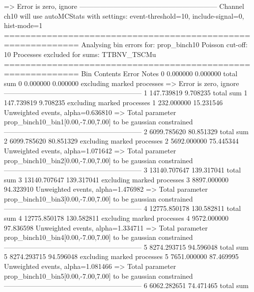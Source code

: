   => Error is zero, ignore      
------------------------------------------------------------
Channel ch10 will use autoMCStats with settings: event-threshold=10, include-signal=0, hist-mode=1
============================================================
Analysing bin errors for: prop_binch10
Poisson cut-off: 10
Processes excluded for sums: TTBNV_TSCMu
============================================================
Bin        Contents        Error           Notes                         
0          0.000000        0.000000        total sum                     
0          0.000000        0.000000        excluding marked processes    
  => Error is zero, ignore      
------------------------------------------------------------
1          147.739819      9.708235        total sum                     
1          147.739819      9.708235        excluding marked processes    
1          232.000000      15.231546       Unweighted events, alpha=0.636810
  => Total parameter prop_binch10_bin1[0.00,-7.00,7.00] to be gaussian constrained
------------------------------------------------------------
2          6099.785620     80.851329       total sum                     
2          6099.785620     80.851329       excluding marked processes    
2          5692.000000     75.445344       Unweighted events, alpha=1.071642
  => Total parameter prop_binch10_bin2[0.00,-7.00,7.00] to be gaussian constrained
------------------------------------------------------------
3          13140.707647    139.317041      total sum                     
3          13140.707647    139.317041      excluding marked processes    
3          8897.000000     94.323910       Unweighted events, alpha=1.476982
  => Total parameter prop_binch10_bin3[0.00,-7.00,7.00] to be gaussian constrained
------------------------------------------------------------
4          12775.850178    130.582811      total sum                     
4          12775.850178    130.582811      excluding marked processes    
4          9572.000000     97.836598       Unweighted events, alpha=1.334711
  => Total parameter prop_binch10_bin4[0.00,-7.00,7.00] to be gaussian constrained
------------------------------------------------------------
5          8274.293715     94.596048       total sum                     
5          8274.293715     94.596048       excluding marked processes    
5          7651.000000     87.469995       Unweighted events, alpha=1.081466
  => Total parameter prop_binch10_bin5[0.00,-7.00,7.00] to be gaussian constrained
------------------------------------------------------------
6          6062.282651     74.471465       total sum                     
